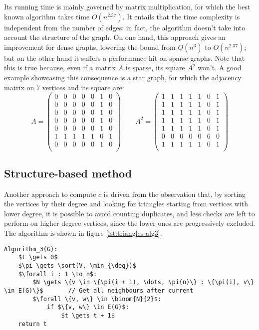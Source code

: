 Its running time is mainly governed by matrix multiplication, for which the best known algorithm takes time $O(n^{2.37})$. It entails that the time complexity is independent from the number of edges: in fact, the algorithm doesn't take into account the structure of the graph. On one hand, this approach gives an improvement for dense graphs, lowering the bound from $O(n^3)$ to $O(n^{2.37})$; but on the other hand it suffers a performance hit on sparse graphs. Note that this is true because, even if a matrix $A$ is sparse, its square $A^2$ won't. A good example showcasing this consequence is a star graph, for which the adjacency matrix on $7$ vertices and its square are:
\[
	A = \begin{pmatrix}
		0 & 0 & 0 & 0 & 0 & 1 & 0 \\
		0 & 0 & 0 & 0 & 0 & 1 & 0 \\
		0 & 0 & 0 & 0 & 0 & 1 & 0 \\
		0 & 0 & 0 & 0 & 0 & 1 & 0 \\
		0 & 0 & 0 & 0 & 0 & 1 & 0 \\
		1 & 1 & 1 & 1 & 1 & 0 & 1 \\
		0 & 0 & 0 & 0 & 0 & 1 & 0 \\
    \end{pmatrix}
    \qquad
	A^2 = \begin{pmatrix}
		1 & 1 & 1 & 1 & 1 & 0 & 1 \\
		1 & 1 & 1 & 1 & 1 & 0 & 1 \\
		1 & 1 & 1 & 1 & 1 & 0 & 1 \\
		1 & 1 & 1 & 1 & 1 & 0 & 1 \\
		1 & 1 & 1 & 1 & 1 & 0 & 1 \\
		0 & 0 & 0 & 0 & 0 & 6 & 0 \\
		1 & 1 & 1 & 1 & 1 & 0 & 1 \\
	\end{pmatrix}
\]


\subsection{Structure-based method}

Another approach to compute $c$ is driven from the observation that, by sorting the vertices by their degree and looking for triangles starting from vertices with lower degree, it is possible to avoid counting duplicates, and less checks are left to perform on higher degree vertices, since the lower ones are progressively excluded. The algorithm is shown in figure \ref{lst:triangles-alg3}.
\begin{lstlisting}[caption = {Algorithm 3}, label = {lst:triangles-alg3}]
Algorithm_3(G):
    $t \gets 0$
    $\pi \gets \sort(V, \min_{\deg})$
    $\forall i : 1 \to n$:
        $N \gets \{v \in \{\pi(i + 1), \dots, \pi(n)\} : \{\pi(i), v\} \in E(G)\}$       // Get all neighbours after current
        $\forall \{v, w\} \in \binom{N}{2}$:
            if $\{v, w\} \in E(G)$:
                $t \gets t + 1$
    return t
\end{lstlisting}

